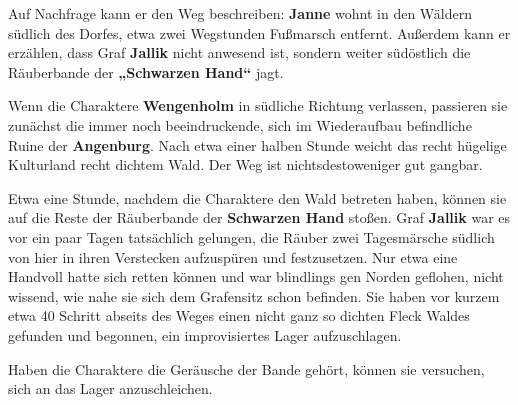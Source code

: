 
Auf Nachfrage kann er den Weg beschreiben: \textbf{Janne} wohnt in den Wäldern südlich des Dorfes, etwa zwei Wegstunden Fußmarsch entfernt.
Außerdem kann er erzählen, dass Graf \textbf{Jallik} nicht anwesend ist, sondern weiter südöstlich die Räuberbande der \textbf{„Schwarzen Hand“} jagt.

\neuespalte


Wenn die Charaktere \textbf{Wengenholm} in südliche Richtung verlassen, passieren sie zunächst die immer noch beeindruckende, sich im Wiederaufbau befindliche Ruine der \textbf{Angenburg}.
Nach etwa einer halben Stunde weicht das recht hügelige Kulturland recht dichtem Wald.
Der Weg ist nichtsdestoweniger gut gangbar.

Etwa eine Stunde, nachdem die Charaktere den Wald betreten haben, können sie auf die Reste der Räuberbande der \textbf{Schwarzen Hand} stoßen.
Graf \textbf{Jallik} war es vor ein paar Tagen tatsächlich gelungen, die Räuber zwei Tagesmärsche südlich von hier in ihren Verstecken aufzuspüren und festzusetzen.
Nur etwa eine Handvoll hatte sich retten können und war blindlings gen Norden geflohen, nicht wissend, wie nahe sie sich dem Grafensitz schon befinden.
Sie haben vor kurzem etwa 40 Schritt abseits des Weges einen nicht ganz so dichten Fleck Waldes gefunden und begonnen, ein improvisiertes Lager aufzuschlagen.



Haben die Charaktere die Geräusche der Bande gehört, können sie versuchen, sich an das Lager anzuschleichen. 

